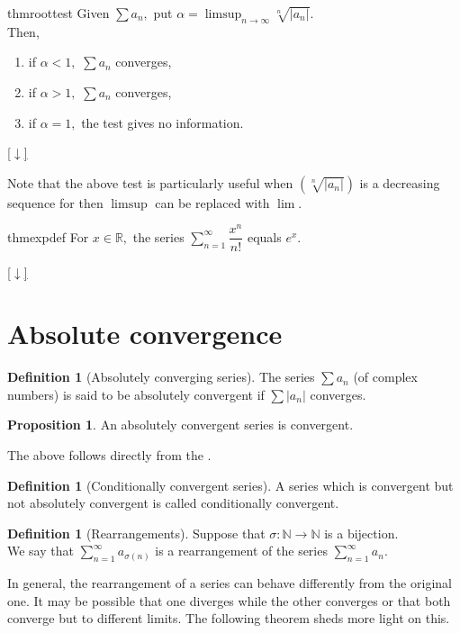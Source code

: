 \documentclass[12pt,oneside]{book}
\theoremstyle{definition}
\numberwithin{thm}{chapter}
\newtheorem{defn}[thm]{Definition}
\newtheorem{prop}[thm]{Proposition}
\newcommand{\downsym}{[$\downarrow$]}
\begin{document}
\begin{restatable}{thm}{roottest}
\label{thm:roottest}
	Given $\sum a_n,$ put $\alpha = \displaystyle\limsup_{n\to\infty}\sqrt[n]{|a_n|}.$\\
	Then,
	\begin{enumerate}[label = (\roman*)]
		\item if $\alpha < 1,$ $\sum a_n$ converges,
		\item if $\alpha > 1,$ $\sum a_n$ converges,
		\item if $\alpha = 1,$ the test gives no information.
	\end{enumerate}
\end{restatable}
\begin{flushright}\hyperref[thm:roottest2]{\downsym}\end{flushright}

Note that the above test is particularly useful when $\left(\sqrt[n]{|a_n|}\right)$ is a decreasing sequence for then $\limsup$ can be replaced with $\lim.$

\begin{restatable}[]{thm}{expdef}
\label{thm:expdef}
	For $x \in \mathbb{R},$ the series $\displaystyle\sum_{n=1}^{\infty}\dfrac{x^n}{n!}$ equals $e^x.$
\end{restatable}
\begin{flushright}\hyperref[thm:expdef2]{\downsym}\end{flushright}

\section{Absolute convergence}

\begin{defn}[Absolutely converging series]
	The series $\sum a_n$ (of complex numbers) is said to be absolutely convergent if $\sum |a_n|$ converges.
\end{defn}

\begin{prop}
	An absolutely convergent series is convergent.
\end{prop}
The above follows directly from the .

\begin{defn}[Conditionally convergent series]
	A series which is convergent but not absolutely convergent is called conditionally convergent.
\end{defn}

\begin{defn}[Rearrangements]
	Suppose that $\sigma:\mathbb{N}\to\mathbb{N}$ is a bijection. \\
	We say that $\displaystyle\sum_{n=1}^{\infty}a_{\sigma(n)}$ is a rearrangement of the series $\displaystyle\sum_{n=1}^{\infty}a_n.$
\end{defn}
In general, the rearrangement of a series can behave differently from the original one. It may be possible that one diverges while the other converges or that both converge but to different limits. The following theorem sheds more light on this.
\end{document}
